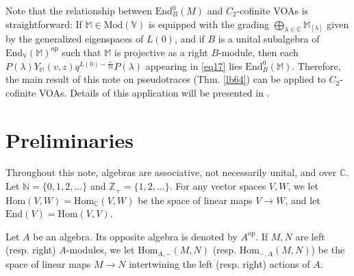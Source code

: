 \documentclass[11pt,b5paper,notitlepage]{article}
\theoremstyle{definition}
\theoremstyle{plain}
\newcommand{\End}{\mathrm{End}} %
\newcommand{\Hom}{\mathrm{Hom}}
\newcommand{\opp}{\mathrm{op}}
\newcommand{\Vbb}{\mathbb V}
\newcommand{\Mbb}{\mathbb M}
\newcommand{\Cbb}{\mathbb C}
\newcommand{\Nbb}{\mathbb N}
\newcommand{\Zbb}{\mathbb Z}
\newcommand{\Mod}{\mathrm{Mod}}
\numberwithin{equation}{section}
\begin{document}
Note that the relationship between $\End^0_B(M)$ and $C_2$-cofinite VOAs is straightforward: If $\Mbb\in\Mod(\Vbb)$ is equipped with the grading $\bigoplus_{\lambda\in\Cbb}\Mbb_{[\lambda]}$ given by the generalized eigenspaces of $L(0)$, and if $B$ is a unital subalgebra of $\End_\Vbb(\Mbb)^\opp$ such that $\Mbb$ is projective as a right $B$-module, then each $P(\lambda)Y_\Mbb(v,z)q^{L(0)-\frac c{24}}P(\lambda)$ appearing in \eqref{eq17} lies $\End^0_B(\Mbb)$. Therefore, the main result of this note on pseudotraces (Thm. \ref{lb64}) can be applied to $C_2$-cofinite VOAs. Details of this application will be presented in \cite{GZ5}.





















































\section{Preliminaries}

Throughout this note, algebras are associative, not necessarily unital, and over $\Cbb$. Let $\Nbb=\{0,1,2,\dots\}$ and $\Zbb_+=\{1,2,\dots\}$. For any vector spaces $V,W$, we let $\Hom(V,W)=\Hom_\Cbb(V,W)$ be the space of linear maps $V\rightarrow W$, and let $\End(V)=\Hom(V,V)$.

Let $A$ be an algebra. Its opposite algebra is denoted by $A^\opp$. If $M,N$ are left (resp. right) $A$-modules, we let $\Hom_{A,-}(M,N)$ (resp. $\Hom_{-,A}(M,N)$) be the space of linear maps $M\rightarrow N$ intertwining the left (resp. right) actions of $A$.
\end{document}
